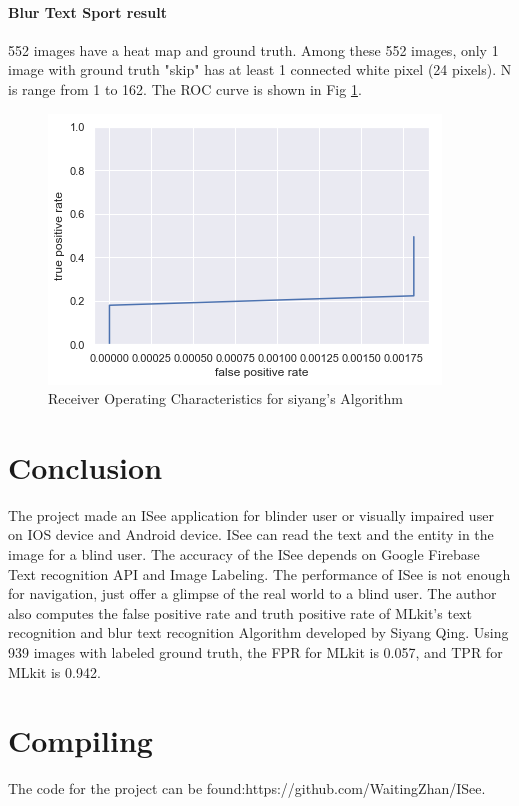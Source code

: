 \documentclass[11pt]{ucscthesis}
\begin{document}
 
 
 \subsubsection{Blur Text Sport result}

552 images have a heat map and ground truth. Among these 552 images, only 1 image with ground truth "skip" has at least 1 connected white pixel (24 pixels). N is range from 1 to 162. The ROC curve is shown in Fig \ref{ROC}. 
   \begin{figure}
    \centering
    \includegraphics[width =0.8\linewidth]{Fig/ROC.png}
    \caption{Receiver Operating Characteristics for siyang's Algorithm}
    \label{ROC}
\end{figure}

\chapter{Conclusion}
The project made an ISee application for blinder user or visually impaired user on IOS device and Android device. ISee can read the text and the entity in the image for a blind user. The accuracy of the ISee depends on Google Firebase Text recognition API and Image Labeling. The performance of ISee is not enough for navigation, just offer a glimpse of the real world to a blind user. The author also computes the false positive rate and truth positive rate of MLkit's text recognition and blur text recognition Algorithm developed by Siyang Qing. Using 939 images with labeled ground truth, the FPR for MLkit is 0.057, and TPR for MLkit is 0.942.

 



\appendix
\chapter{Compiling}
The code for the project can be found:https://github.com/WaitingZhan/ISee.
\end{document}
